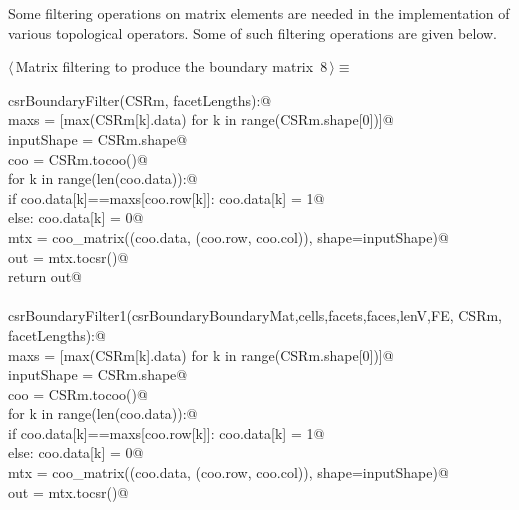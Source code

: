 \documentclass[11pt,oneside]{article}    %
\begin{document}
Some filtering operations on matrix elements are needed in the implementation of various topological operators. Some of such filtering operations are given below.

\begin{flushleft} \small \label{scrap14}
\protect{}$\langle\,$Matrix filtering to produce the boundary matrix\nobreak\ {\footnotesize 8}$\,\rangle\equiv$
\vspace{-1ex}
\begin{list}{}{} \item
\mbox{}\verb@def csrBoundaryFilter(CSRm, facetLengths):@\\
\mbox{}\verb@    maxs = [max(CSRm[k].data) for k in range(CSRm.shape[0])]@\\
\mbox{}\verb@    inputShape = CSRm.shape@\\
\mbox{}\verb@    coo = CSRm.tocoo()@\\
\mbox{}\verb@    for k in range(len(coo.data)):@\\
\mbox{}\verb@        if coo.data[k]==maxs[coo.row[k]]: coo.data[k] = 1@\\
\mbox{}\verb@        else: coo.data[k] = 0@\\
\mbox{}\verb@    mtx = coo_matrix((coo.data, (coo.row, coo.col)), shape=inputShape)@\\
\mbox{}\verb@    out = mtx.tocsr()@\\
\mbox{}\verb@    return out@\\
\mbox{}\verb@@\\
\mbox{}\verb@def csrBoundaryFilter1(csrBoundaryBoundaryMat,cells,facets,faces,lenV,FE, CSRm, facetLengths):@\\
\mbox{}\verb@    maxs = [max(CSRm[k].data) for k in range(CSRm.shape[0])]@\\
\mbox{}\verb@    inputShape = CSRm.shape@\\
\mbox{}\verb@    coo = CSRm.tocoo()@\\
\mbox{}\verb@    for k in range(len(coo.data)):@\\
\mbox{}\verb@        if coo.data[k]==maxs[coo.row[k]]: coo.data[k] = 1@\\
\mbox{}\verb@        else: coo.data[k] = 0@\\
\mbox{}\verb@    mtx = coo_matrix((coo.data, (coo.row, coo.col)), shape=inputShape)@\\
\mbox{}\verb@    out = mtx.tocsr()@\\

\end{list}
\end{flushleft}
\end{document}

